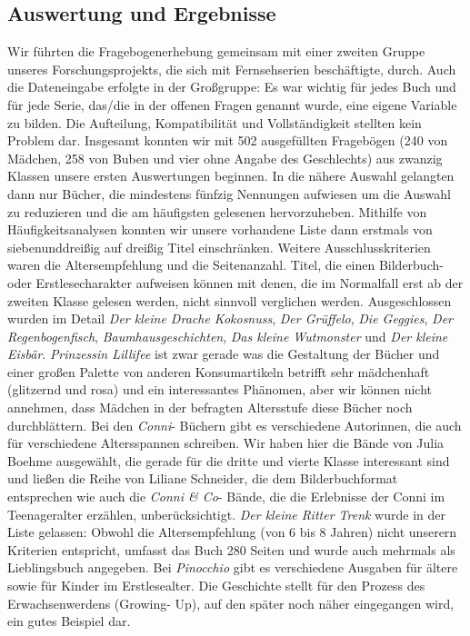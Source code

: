 \subsection{Auswertung und Ergebnisse}

Wir führten die Fragebogenerhebung gemeinsam mit einer zweiten Gruppe
unseres Forschungsprojekts, die sich mit Fernsehserien beschäftigte,
durch. Auch die Dateneingabe erfolgte in der Großgruppe: Es war wichtig
für jedes Buch und für jede Serie, das/die in der offenen Fragen genannt
wurde, eine eigene Variable zu bilden. Die Aufteilung, Kompatibilität
und Vollständigkeit stellten kein Problem dar. Insgesamt konnten wir mit
502 ausgefüllten Fragebögen (240 von Mädchen, 258 von Buben und vier
ohne Angabe des Geschlechts) aus zwanzig Klassen unsere ersten
Auswertungen beginnen. In die nähere Auswahl gelangten dann nur Bücher,
die mindestens fünfzig Nennungen aufwiesen um die Auswahl zu reduzieren
und die am häufigsten gelesenen hervorzuheben. Mithilfe von
Häufigkeitsanalysen konnten wir unsere vorhandene Liste dann erstmals
von siebenunddreißig auf dreißig Titel einschränken. Weitere
Ausschlusskriterien waren die Altersempfehlung und die Seitenanzahl.
Titel, die einen Bilderbuch- oder Erstlesecharakter aufweisen können mit
denen, die im Normalfall erst ab der zweiten Klasse gelesen werden,
nicht sinnvoll verglichen werden. Ausgeschlossen wurden im Detail
\emph{Der kleine Drache Kokosnuss}, \emph{Der Grüffelo}, \emph{Die
Geggies}, \emph{Der Regenbogenfisch}, \emph{Baumhausgeschichten},
\emph{Das kleine Wutmonster} und \emph{Der kleine Eisbär}.
\emph{Prinzessin Lillifee} ist zwar gerade was die Gestaltung der Bücher
und einer großen Palette von anderen Konsumartikeln betrifft sehr
mädchenhaft (glitzernd und rosa) und ein interessantes Phänomen, aber
wir können nicht annehmen, dass Mädchen in der befragten Altersstufe
diese Bücher noch durchblättern. Bei den \emph{Conni}- Büchern gibt es
verschiedene Autorinnen, die auch für verschiedene Altersspannen
schreiben. Wir haben hier die Bände von Julia Boehme ausgewählt, die
gerade für die dritte und vierte Klasse interessant sind und ließen die
Reihe von Liliane Schneider, die dem Bilderbuchformat entsprechen wie
auch die \emph{Conni \& Co}- Bände, die die Erlebnisse der Conni im
Teenageralter erzählen, unberücksichtigt. \emph{Der kleine Ritter Trenk}
wurde in der Liste gelassen: Obwohl die Altersempfehlung (von 6 bis 8
Jahren) nicht unserern Kriterien entspricht, umfasst das Buch 280 Seiten
und wurde auch mehrmals als Lieblingsbuch angegeben. Bei
\emph{Pinocchio} gibt es verschiedene Ausgaben für ältere sowie für
Kinder im Erstlesealter. Die Geschichte stellt für den Prozess des
Erwachsenwerdens (Growing- Up), auf den später noch näher eingegangen
wird, ein gutes Beispiel dar.

